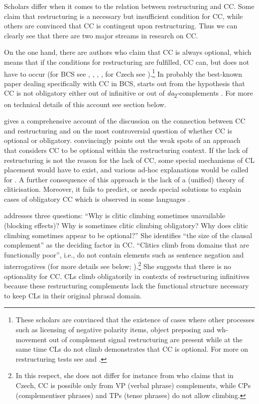 Scholars differ when it comes to the relation between restructuring and CC. Some claim that restructuring is a necessary but insufficient condition for CC, while others are convinced that CC is contingent upon restructuring. Thus we can clearly see that there are two major streams in research on CC. 

On the one hand, there are authors who claim that CC is always optional, which means that if the conditions for restructuring are fulfilled, CC can, but does not have to occur (for BCS see \citealt{Progovac93}, \citealt{Progovac96}, \citealt{CavarWilder94}, \citealt{Stjepanovic04}, for Czech see \citealt{Rezac05}).\footnote{These scholars are convinced that the existence of cases where other processes such as licensing of negative polarity items, object preposing and wh-movement out of complement signal restructuring are present while  at the same time CLs do not climb demonstrates that CC is optional. For more on restructuring tests see \citet[50--53]{Progovac94} and \citet[178--179]{Stjepanovic04}.} In probably the best-known paper dealing specifically with CC in BCS, \citeauthor{Stjepanovic04} starts out from the hypothesis that CC is not obligatory either out of infinitive or out of \textit{da}\textsubscript{2}-complements \citep[cf.][181, 186, 205]{Stjepanovic04}. For more on technical details of this account see section below. 

\citet{Aljovic05} gives a comprehensive account of the discussion on the connection between CC and restructuring and on the most controversial question of whether CC is optional or obligatory. \citet{Aljovic04, Aljovic05} convincingly points out the weak spots of an approach that considers CC to be optional within the restructuring context. If the lack of restructuring is not the reason for the lack of CC, some special mechanisms of CL placement would have to exist, and various ad-hoc explanations would be called for \citep[3]{Aljovic05}. A further consequence of this approach is the lack of a (unified) theory of cliticisation. Moreover, it fails to predict, or needs special solutions to explain cases of obligatory CC which is observed in some languages \citep[cf.][3]{Aljovic05}. 

\begin{sloppypar}
\citet[6]{Aljovic05} addresses three questions: “Why is clitic climbing sometimes unavailable (blocking effects)? Why is sometimes clitic climbing obligatory? Why does clitic climbing sometimes appear to be optional?” She identifies “the size of the clausal complement” as the deciding factor in CC. “Clitics climb from domains that are functionally poor”, i.e., do not contain elements such as sentence negation and interrogatives (for more details see below; \citealt[cf.][]{Aljovic05}).\footnote{In this respect, she does not differ for instance from \citet{Rezac05} who claims that in Czech, CC is possible only from VP (verbal phrase) complements, while CPs (complementiser phrases) and TPs (tense phrases) do not allow climbing.} She suggests that there is no optionality for CC. CLs climb obligatorily in contexts of restructuring infinitives because these restructuring complements lack the functional structure necessary to keep CLs in their original phrasal domain. 
\end{sloppypar}

